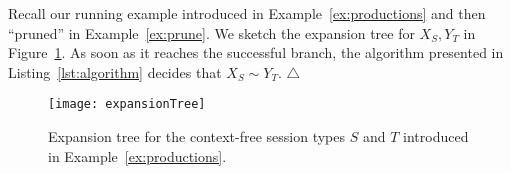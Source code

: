 \begin{example}
	Recall our running example introduced in Example~\ref{ex:productions} and then
	``pruned'' in Example~\ref{ex:prune}. We sketch the expansion tree for 
	$X_S, Y_T$ in Figure~\ref{fig:expansionTree}. As soon as it reaches
	the successful branch, the algorithm presented in Listing~\ref{lst:algorithm}
	decides that $X_S\sim Y_T$. \hfill$\triangle$
\end{example}

\begin{figure}[h]
\centering
	\texttt{[image: expansionTree]}
	\caption{Expansion tree for the context-free session types $S$ and $T$
	introduced in Example~\ref{ex:productions}.}
	\label{fig:expansionTree}
\end{figure}

